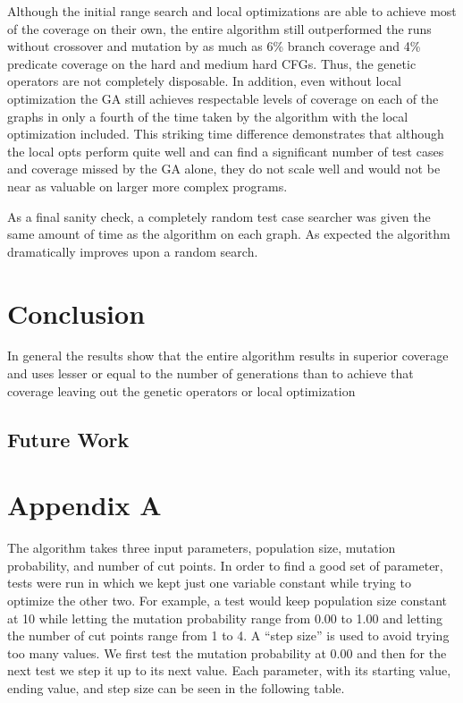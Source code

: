 \documentclass[runningheads]{llncs}
\begin{document}
Although the initial range search and local optimizations are able to achieve most of the coverage on their own, the entire algorithm still outperformed the runs without crossover and mutation by as much as 6\% branch coverage and 4\% predicate coverage on the hard and medium hard CFGs. Thus, the genetic operators are not completely disposable. In addition, even without local optimization the GA still achieves respectable levels of coverage on each of the graphs in only a fourth of the time taken by the algorithm with the local optimization included. This striking time difference demonstrates that although the local opts perform quite well and can find a significant number of test cases and coverage missed by the GA alone, they do not scale well and would not be near as valuable on larger more complex programs. 

As a final sanity check, a completely random test case searcher was given the same amount of time as the algorithm on each graph. As expected the algorithm dramatically improves upon a random search.
 

\newpage
\section{Conclusion}


In general the results show that the entire algorithm results in superior coverage and uses lesser or equal to the number of generations than to achieve that coverage leaving out the genetic operators or local optimization

\subsection{Future Work}

\newpage
\section*{Appendix A}

The algorithm takes three input parameters, population size, mutation probability, and number of cut points. In order to find a good set of parameter, tests were run in which we kept just one variable constant while trying to optimize the other two. For example, a test would keep population size constant at 10 while letting the mutation probability range from 0.00 to 1.00 and letting the number of cut points range from 1 to 4. A ``step size'' is used to avoid trying too many values. We first test the mutation probability at 0.00 and then for the next test we step it up to its next value. Each parameter, with its starting value, ending value, and step size can be seen in the following table.
\end{document}
